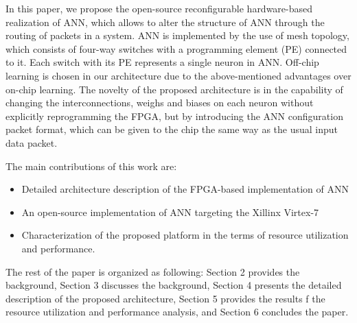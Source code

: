 In this paper, we propose the open-source reconfigurable hardware-based realization of ANN, which allows to alter the structure of ANN through the routing of packets in a system. ANN is implemented by the use of mesh topology, which consists of four-way switches with a programming element (PE) connected to it. Each switch with its PE represents a single neuron in ANN. Off-chip learning is chosen in our architecture due to the above-mentioned advantages over on-chip learning. The novelty of the proposed architecture is in the capability of changing the interconnections, weighs and biases on each neuron without explicitly reprogramming the FPGA, but by introducing the ANN configuration packet format, which can be given to the chip the same way as the usual input data packet.  

The main contributions of this work are:
\begin{itemize}
    \item Detailed architecture description of the FPGA-based implementation of ANN
    \item An open-source implementation of ANN targeting the Xillinx Virtex-7
    \item  Characterization of the proposed platform in the terms of resource utilization and performance.
\end{itemize}
 
The rest of the paper is organized as following: Section 2 provides the background, Section 3 discusses the background, Section 4 presents the detailed description of the proposed architecture, Section 5 provides the results f the resource utilization and performance analysis, and Section 6 concludes the paper.
